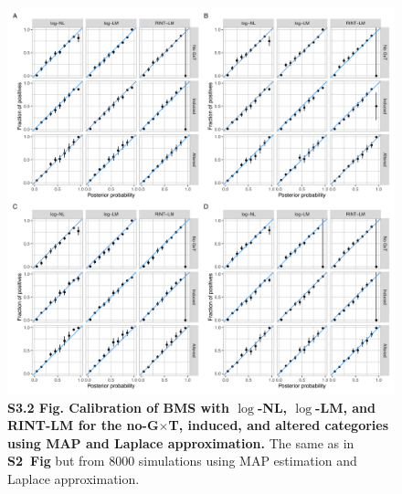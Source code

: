 \documentclass[11pt]{article}
\newcommand{\GxT}{G$\times$T\xspace}
\newcommand{\sfigroccmcmc}{\textbf{S2~Fig}\xspace}
\begin{document}
\begin{figure}[!ht]
\begin{center}
  \includegraphics[width=1\textwidth]{png/sim_calib_map_lap.png}
\end{center}  
\caption{
  {\bf
    S3.2 Fig. Calibration of BMS with $\log$-NL, $\log$-LM, and RINT-LM for the no-\GxT, induced, and altered categories using MAP and Laplace approximation.}
The same as in \sfigroccmcmc but from 8000 simulations using MAP estimation and Laplace approximation.
}
\label{s-fig:sim-calib-map}
\end{figure}
\end{document}
